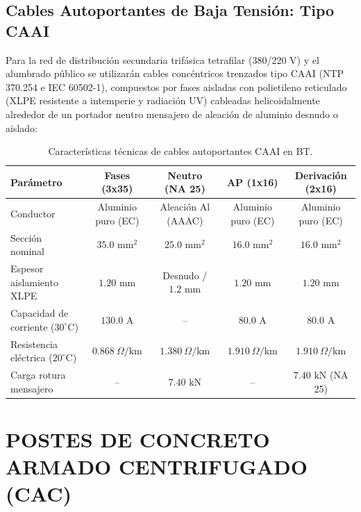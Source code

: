 \subsection{Cables Autoportantes de Baja Tensión: Tipo CAAI}
Para la red de distribución secundaria trifásica tetrafilar (380/220 V) y el alumbrado público se utilizarán cables concéntricos trenzados tipo CAAI (NTP 370.254 e IEC 60502-1), compuestos por fases aisladas con polietileno reticulado (XLPE resistente a intemperie y radiación UV) cableadas helicoidalmente alrededor de un portador neutro mensajero de aleación de aluminio desnudo o aislado:
\begin{table}[H]
\centering
\small
\begin{tabular}{|l|c|c|c|c|}
\hline
\textbf{Parámetro} & \textbf{Fases (3x35)} & \textbf{Neutro (NA 25)} & \textbf{AP (1x16)} & \textbf{Derivación (2x16)} \\
\hline
Conductor & Aluminio puro (EC) & Aleación Al (AAAC) & Aluminio puro (EC) & Aluminio puro (EC) \\
Sección nominal & $35.0\text{ mm}^2$ & $25.0\text{ mm}^2$ & $16.0\text{ mm}^2$ & $16.0\text{ mm}^2$ \\
Espesor aislamiento XLPE & $1.20\text{ mm}$ & Desnudo / $1.2\text{ mm}$ & $1.20\text{ mm}$ & $1.20\text{ mm}$ \\
Capacidad de corriente ($30^\circ\text{C}$) & $130.0\text{ A}$ & -- & $80.0\text{ A}$ & $80.0\text{ A}$ \\
Resistencia eléctrica ($20^\circ\text{C}$) & $0.868\ \Omega/\text{km}$ & $1.380\ \Omega/\text{km}$ & $1.910\ \Omega/\text{km}$ & $1.910\ \Omega/\text{km}$ \\
Carga rotura mensajero & -- & $7.40\text{ kN}$ & -- & $7.40\text{ kN}$ (NA 25) \\
\hline
\end{tabular}
\caption{Características técnicas de cables autoportantes CAAI en BT.}
\end{table}

\section{POSTES DE CONCRETO ARMADO CENTRIFUGADO (CAC)}

